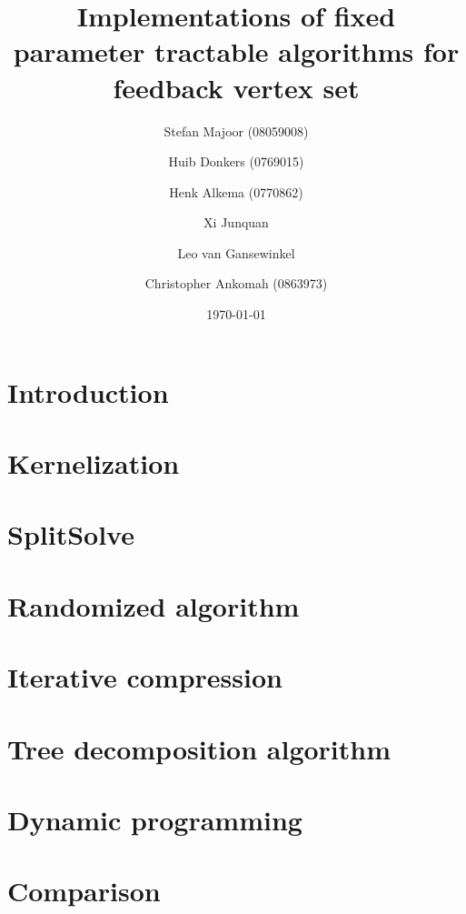 \documentclass[a4paper,10pt]{article}
\title{Implementations of fixed parameter tractable algorithms for feedback vertex set}
\author{
	Stefan Majoor (08059008)
	\and
	Huib Donkers (0769015)
	\and
	Henk Alkema (0770862)
	\and
	Xi Junquan
	\and
	Leo van Gansewinkel
	\and
	Christopher Ankomah (0863973)
}
\date{\today}
\begin{document}
\maketitle
\setcounter{tocdepth}{2}
\tableofcontents
\clearpage

\begin{abstract}

\end{abstract}

\section{Introduction} \label{sec:intro}


\section{Kernelization} \label{sec:kern}


\section{SplitSolve} \label{sec:splitsolve}


\section{Randomized algorithm} \label{sec:rand}


\section{Iterative compression} \label{sec:itcomp}


\section{Tree decomposition algorithm} \label{sec:treewidth}


\section{Dynamic programming} \label{sec:dynamic program}


\section{Comparison} \label{sec:comparison}

\end{document}
